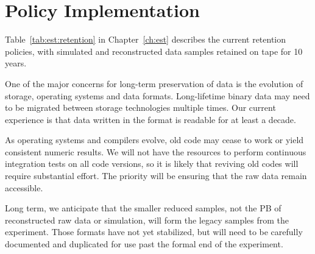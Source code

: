 \documentclass[../main-v1.tex]{subfiles}
\begin{document}
\section{Policy Implementation}
Table~\ref{tab:est:retention} in Chapter~\ref{ch:est} describes the current retention policies, with simulated and reconstructed data samples retained on tape for 10 years. 

One of the major concerns for long-term preservation of data is the evolution of storage,  operating systems and data formats. Long-lifetime binary data may need to be migrated between storage technologies multiple times.   Our current experience is that data written in the  format is readable for at least a decade.   

As operating systems and compilers evolve, old code may cease to work or yield consistent numeric results. %
We will not have the resources to perform continuous integration tests on all code versions, so it is likely that reviving old codes will require substantial effort. The priority will be ensuring that the raw data remain accessible. 

Long term, we anticipate that the smaller reduced samples, not the PB of reconstructed raw data or simulation, will form the legacy samples from the experiment.  Those formats have not yet stabilized, but will need to be carefully documented and duplicated for use past the formal end of the experiment.



\end{document}
